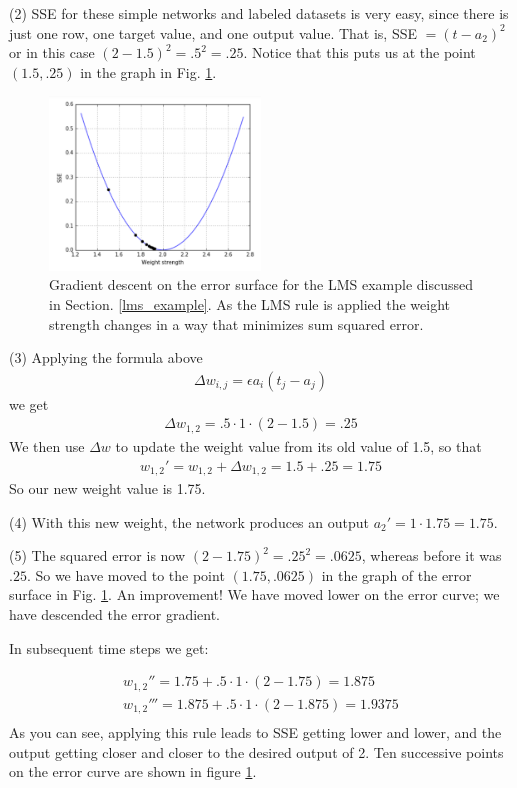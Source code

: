 (2) SSE for these simple networks and labeled datasets is very easy, since there is just one row, one target value, and one output value. That is,  SSE $= (t - a_2)^2$ or in this case $(2-1.5)^2 = .5^2 = .25$. Notice that this puts us at the point $(1.5,.25)$ in the graph in Fig. \ref{error_lms}.

\begin{figure}[h]
\centering
\includegraphics[width=0.5\textwidth]{images/error_lms.png}
\caption[Jeff Yoshimi.]{Gradient descent on the error surface for the LMS example discussed in Section. \ref{lms_example}. As the LMS rule is applied the weight strength changes in a way that minimizes sum squared error.}
\label{error_lms}
\end{figure}

(3) Applying the formula above
\begin{eqnarray*}
\Delta w_{i,j}  =  \epsilon a_i (t_j - a_j)
\end{eqnarray*}
we get
\begin{eqnarray*}
\Delta w_{1,2}  =  .5 \cdot 1 \cdot (2- 1.5) = .25
\end{eqnarray*}
We then use $\Delta w$ to update the weight value from its old value of 1.5, so that
\begin{eqnarray*}
w_{1,2}' = w_{1,2} + \Delta w_{1,2}  = 1.5 +.25  = 1.75
\end{eqnarray*}
So our new weight value is 1.75. 

(4) With this new weight, the network produces an output  $a_2' = 1 \cdot 1.75 = 1.75$. 

(5) The squared error is now $(2-1.75)^2=.25^2=.0625$, whereas before it was $.25$. So we have moved to the point $(1.75,.0625)$ in the graph  of the error surface in Fig. \ref{error_lms}. An improvement!  We have moved lower on the error curve; we have descended the error gradient.

In subsequent time steps we get:

\begin{eqnarray*}
w_{1,2}'' = 1.75 + .5 \cdot 1 \cdot (2 - 1.75) = 1.875 \\
w_{1,2}''' = 1.875 + .5 \cdot 1 \cdot (2 - 1.875) = 1. 9375 \\
\end{eqnarray*}
As you can see, applying this rule leads to SSE getting lower and lower, and the output getting closer and closer to the desired output of 2. Ten successive points on the error curve are shown in figure \ref{error_lms}.

